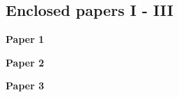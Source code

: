 \backmatter
\cleardoublepage
{}
\pagestyle{empty}

\begin{titlepage}
   \huge
   \chapter{Enclosed papers I - III}
\end{titlepage}

\begin{titlepage}
  \LARGE
  \textbf{Paper 1}
\end{titlepage}

\begin{titlepage}
\end{titlepage}



\begin{titlepage}
  \LARGE
  \textbf{Paper 2}
\end{titlepage}

\begin{titlepage}
\end{titlepage}





\begin{titlepage}
  \LARGE
  \textbf{Paper 3}
\end{titlepage}

\begin{titlepage}
\end{titlepage}




